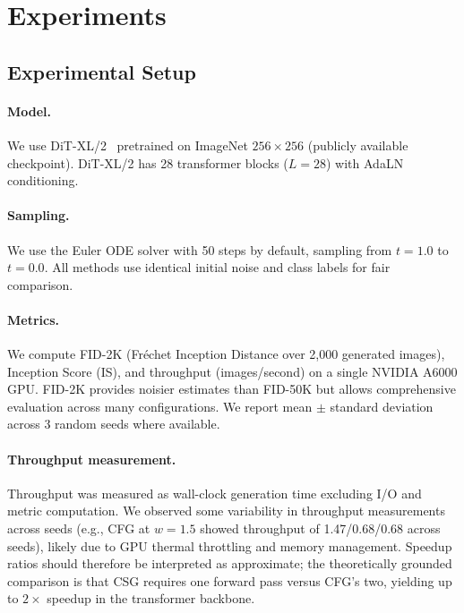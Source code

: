 \documentclass{article}
\newcommand{\adaln}{AdaLN}
\begin{document}
\section{Experiments}
\label{sec:experiments}

\subsection{Experimental Setup}

\paragraph{Model.} We use DiT-XL/2~\citep{peebles2023scalable} pretrained on ImageNet $256\times 256$ (publicly available checkpoint). DiT-XL/2 has 28 transformer blocks ($L = 28$) with \adaln{} conditioning.

\paragraph{Sampling.} We use the Euler ODE solver with 50 steps by default, sampling from $t = 1.0$ to $t = 0.0$. All methods use identical initial noise and class labels for fair comparison.

\paragraph{Metrics.} We compute FID-2K (Fr\'{e}chet Inception Distance over 2,000 generated images), Inception Score (IS), and throughput (images/second) on a single NVIDIA A6000 GPU. FID-2K provides noisier estimates than FID-50K but allows comprehensive evaluation across many configurations. We report mean $\pm$ standard deviation across 3 random seeds where available.

\paragraph{Throughput measurement.} Throughput was measured as wall-clock generation time excluding I/O and metric computation. We observed some variability in throughput measurements across seeds (e.g., CFG at $w = 1.5$ showed throughput of 1.47/0.68/0.68 across seeds), likely due to GPU thermal throttling and memory management. Speedup ratios should therefore be interpreted as approximate; the theoretically grounded comparison is that CSG requires one forward pass versus CFG's two, yielding up to $2\times$ speedup in the transformer backbone.
\end{document}
